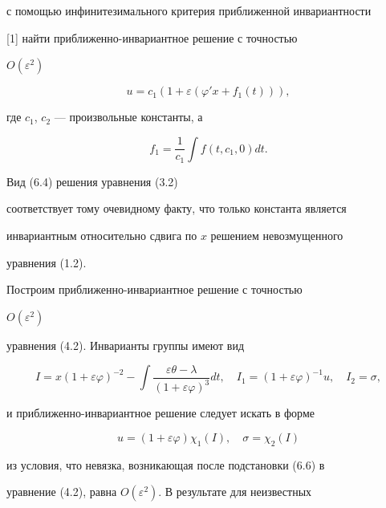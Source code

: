 с помощью инфинитезимального критерия приближенной инвариантности 


[1] найти приближенно-инвариантное решение с точностью 


$O(\varepsilon^2)$ 


\begin{equation} 


u=c_1(1+\varepsilon(\varphi'x+f_1(t))),\tag{6.4} 


\end{equation} 


где $c_1$, $c_2$ --- произвольные константы, а 


$$ 


f_1=\frac{1}{c_1}\int f(t,c_1,0)dt. 


$$ 


Вид (6.4) решения уравнения (3.2) 


соответствует тому очевидному факту, что только константа является 


инвариантным относительно сдвига по $x$ решением невозмущенного 


уравнения (1.2). 


 


Построим приближенно-инвариантное решение с точностью 


$O(\varepsilon^2)$ 


уравнения (4.2). Инварианты группы имеют вид


\begin{equation} 


I=x(1+\varepsilon\varphi)^{-2}-\int 


\frac{\varepsilon\theta-\lambda}{(1+\varepsilon\varphi)^3}dt,\quad 


I_1=(1+\varepsilon\varphi)^{-1}u,\quad I_2=\sigma,\tag{6.5} 


\end{equation} 


и приближенно-инвариантное решение следует искать в форме


\begin{equation} 


u=(1+\varepsilon\varphi)\chi_1(I),\quad 


\sigma=\chi_2(I)\tag{6.6} 


\end{equation} 


из условия, что невязка, возникающая после подстановки (6.6) в 


уравнение (4.2), равна $O(\varepsilon^2)$. В результате для неизвестных 



